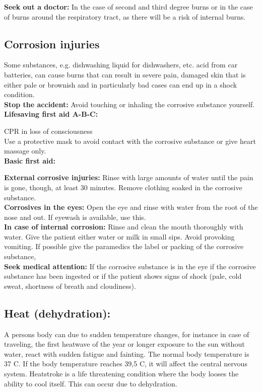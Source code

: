 \documentclass[../../../main.tex]{subfiles}
\begin{document}
\begin{multicols}{2}
\textbf{Seek out a doctor:} In the case of second and third degree burns or in the case of burns around the respiratory tract, as there will be a risk of internal burns.
\\
\subsection*{Corrosion injuries} Some substances, e.g. dishwashing liquid for dishwashers, etc. acid from car batteries, can cause burns that can result in severe pain, damaged skin that is either pale or brownish and in particularly bad cases can end up in a shock condition.
\\

\textbf{Stop the accident:} Avoid touching or inhaling the corrosive substance yourself.
\\

\textbf{Lifesaving first aid A-B-C:} 

\textbf{}CPR in loss of consciousness
\\
\textbf{}Use a protective mask to avoid contact with the corrosive substance or give heart massage only.
\\

\textbf{Basic first aid:} 

\textbf{External corrosive injuries:} Rinse with large amounts of water until the pain is gone, though, at least 30 minutes. Remove clothing soaked in the corrosive substance.
\\

\textbf{Corrosives in the eyes:} Open the eye and rinse with water from the root of the nose and out. If eyewash is available, use this.
\\

\textbf{In case of internal corrosion:} Rinse and clean the mouth thoroughly with water. Give the patient either water or milk in small sips. Avoid provoking vomiting. If possible give the paramedics the label or packing of the corrosive substance, 
\\

\textbf{Seek medical attention:} If the corrosive substance is in the eye if the corrosive substance has been ingested or if the patient shows signs of shock (pale, cold sweat, shortness of breath and cloudiness).

\subsection*{Heat (dehydration):} A persons body can due to sudden temperature changes, for instance in case of traveling, the first heatwave of the year or longer exposure to the sun without water, react with sudden fatigue and fainting. The normal body temperature is 37 C. If the body temperature reaches 39,5 C, it will affect the central nervous system. Heatstroke is a life threatening condition where the body looses the ability to cool itself. This can occur due to dehydration.
\\


\end{multicols}
\end{document}

